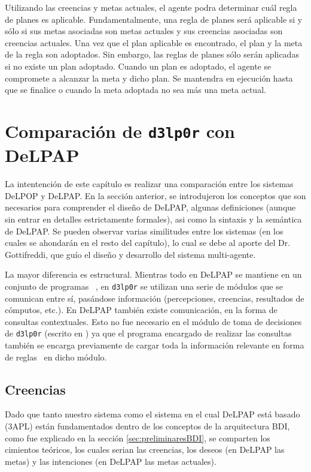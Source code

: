 Utilizando las creencias y metas actuales, el agente podra determinar cuál regla de planes es 
aplicable. Fundamentalmente, una regla de planes será aplicable si y sólo si sus metas asociadas son 
metas actuales y sus creencias asociadas son creencias actuales. Una vez que el plan aplicable es 
encontrado, el plan y la meta de la regla son adoptados. Sin embargo, las reglas de planes sólo serán 
aplicadas si no existe un plan adoptado. Cuando un plan es adoptado, el agente se compromete a 
alcanzar la meta y dicho plan. Se mantendra en ejecución hasta que se finalice o cuando la meta 
adoptada no sea más una meta actual.

\section{Comparación de \texttt{d3lp0r} con DeLPAP} %

La intentención de este capítulo es realizar una comparación entre los sistemas DeLPOP y DeLPAP. En la
sección anterior, se introdujeron los conceptos que son necesarios para comprender el diseño de 
DeLPAP, algunas definiciones (aunque sin entrar en detalles estrictamente formales), asi como la 
sintaxis y la semántica de DeLPAP. Se pueden observar varias similitudes entre los sistemas (en los 
cuales se ahondarán en el resto del capítulo), lo cual se debe al aporte del Dr. Gottifreddi, que guío
el diseño y desarrollo del sistema multi-agente.

La mayor diferencia es estructural. Mientras todo en DeLPAP se mantiene en un conjunto de programas 
\DLP\ , en \texttt{d3lp0r} se utilizan una serie de módulos que se comunican entre sí, pasándose información
(percepciones, creencias, resultados de cómputos, etc.). En DeLPAP también existe comunicación, en la 
forma de consultas contextuales. Esto no fue necesario en el módulo de toma de decisiones de \texttt{d3lp0r} 
(escrito en \DLP) ya que el programa encargado de realizar las consultas también se encarga 
previamente de cargar toda la información relevante en forma de reglas \DLP\ en dicho módulo.

\subsection{Creencias}

Dado que tanto nuestro sistema como el sistema en el cual DeLPAP está basado (3APL) están 
fundamentados dentro de los conceptos de la arquitectura BDI, como fue explicado en la sección
\ref{sec:preliminaresBDI}, se comparten los cimientos teóricos, los cuales serian las creencias, los 
deseos (en DeLPAP las metas) y las intenciones (en DeLPAP las metas actuales).

